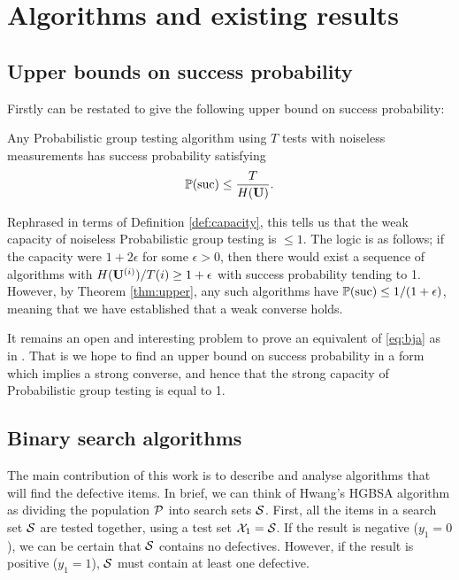 \section{Algorithms and existing results}

\subsection{Upper bounds on success probability} \label{sec:ub}

Firstly \cite[Theorem 1]{li5} can be restated to give the following
upper bound on success probability:
%
\begin{theorem} \label{thm:upper}
Any Probabilistic group testing algorithm using $T$ tests with noiseless measurements has success probability satisfying
$$ {\mathbb{P}}({\mathrm{suc}}) \leq \frac{T}{H( {\mathbf{ U}})}.$$
\end{theorem}

Rephrased in terms of Definition \ref{def:capacity}, this tells us that the weak capacity of noiseless Probabilistic 
group testing is $\leq 1$. The logic is as follows; if the capacity were
$1 + 2 \epsilon$ for some $\epsilon > 0$, then there would exist a sequence of algorithms with $H({\mathbf{ U}}^{(i)})/T(i) \geq 1 + \epsilon$ with success probability tending to 1.
However, by Theorem \ref{thm:upper}, any such algorithms have ${\mathbb{P}}({\mathrm{suc}}) \leq 1/(1+\epsilon)$, meaning that we have 
established that a weak converse holds.

\begin{remark}
It remains an open and interesting problem to prove an equivalent of \eqref{eq:bja} as in \cite[Theorem 3.1]{johnsonc10}. That is we hope to find an upper bound
on success probability in a form  which implies a strong converse, and hence that the strong capacity of Probabilistic group
testing is equal to 1.
\end{remark}

\subsection{Binary search algorithms}

The main contribution of this work is  to describe and analyse algorithms that will find the defective items.
In brief, we can think of Hwang's HGBSA algorithm as dividing the population ${\mathcal{P}}$ into search sets ${\mathcal{S}}$. First, all the items in a search set ${\mathcal{S}}$ are tested together,
using a test set ${\mathcal{X}}_1 = {\mathcal{S}}$. If the result is negative
($y_1 = 0$), we can be certain that ${\mathcal{S}}$ contains no defectives. However, if the result is positive ($y_1 = 1$),  ${\mathcal{S}}$ must contain at least one defective.

